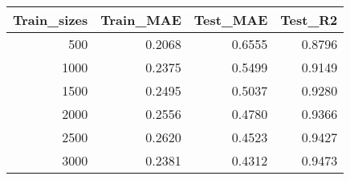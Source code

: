 \begin{tabular}{rrrr}
\toprule
Train_sizes & Train_MAE & Test_MAE & Test_R2 \\
\midrule
500 & 0.2068 & 0.6555 & 0.8796 \\
1000 & 0.2375 & 0.5499 & 0.9149 \\
1500 & 0.2495 & 0.5037 & 0.9280 \\
2000 & 0.2556 & 0.4780 & 0.9366 \\
2500 & 0.2620 & 0.4523 & 0.9427 \\
3000 & 0.2381 & 0.4312 & 0.9473 \\
\bottomrule
\end{tabular}
